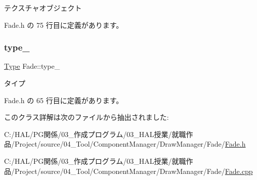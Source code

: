 テクスチャオブジェクト 



 Fade.\+h の 75 行目に定義があります。

\mbox{\label{class_fade_a1d04a65762c863a1d3571f0e1d47532a}} 
\subsubsection{\texorpdfstring{type\+\_\+}{type\_}}
{\footnotesize\ttfamily \mbox{\hyperlink{class_fade_ac06f27215b454aa05b93c236476d6e80}{Type}} Fade\+::type\+\_\+\hspace{0.3cm}{\ttfamily [private]}}



タイプ 



 Fade.\+h の 65 行目に定義があります。



このクラス詳解は次のファイルから抽出されました\+:\begin{DoxyCompactItemize}
\item 
C\+:/\+H\+A\+L/\+P\+G関係/03\+\_\+作成プログラム/03\+\_\+\+H\+A\+L授業/就職作品/\+Project/source/04\+\_\+\+Tool/\+Component\+Manager/\+Draw\+Manager/\+Fade/\mbox{\hyperlink{_fade_8h}{Fade.\+h}}\item 
C\+:/\+H\+A\+L/\+P\+G関係/03\+\_\+作成プログラム/03\+\_\+\+H\+A\+L授業/就職作品/\+Project/source/04\+\_\+\+Tool/\+Component\+Manager/\+Draw\+Manager/\+Fade/\mbox{\hyperlink{_fade_8cpp}{Fade.\+cpp}}\end{DoxyCompactItemize}

